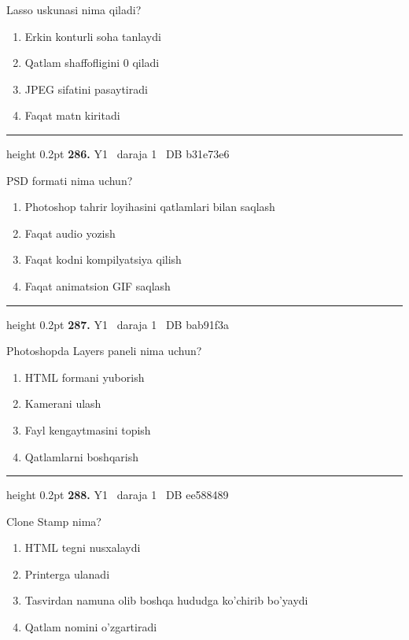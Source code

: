\documentclass[10pt,a4paper,oneside]{article}
\begin{document}
Lasso uskunasi nima qiladi?
\begin{enumerate}[label=\Alph*),leftmargin=9mm]
\item Erkin konturli soha tanlaydi
\item Qatlam shaffofligini 0 qiladi
\item JPEG sifatini pasaytiradi
\item Faqat matn kiritadi
\end{enumerate}
\vspace{2mm}\hrule height 0.2pt \vspace{4mm}
\hypertarget{q286}{\textbf{\color{ink}286.}}  {\color{muted}\scriptsize Y1 \textbullet\ daraja 1 \textbullet\ DB b31e73e6}
\par
PSD formati nima uchun?
\begin{enumerate}[label=\Alph*),leftmargin=9mm]
\item Photoshop tahrir loyihasini qatlamlari bilan saqlash
\item Faqat audio yozish
\item Faqat kodni kompilyatsiya qilish
\item Faqat animatsion GIF saqlash
\end{enumerate}
\vspace{2mm}\hrule height 0.2pt \vspace{4mm}
\hypertarget{q287}{\textbf{\color{ink}287.}}  {\color{muted}\scriptsize Y1 \textbullet\ daraja 1 \textbullet\ DB bab91f3a}
\par
Photoshopda Layers paneli nima uchun?
\begin{enumerate}[label=\Alph*),leftmargin=9mm]
\item HTML formani yuborish
\item Kamerani ulash
\item Fayl kengaytmasini topish
\item Qatlamlarni boshqarish
\end{enumerate}
\vspace{2mm}\hrule height 0.2pt \vspace{4mm}
\hypertarget{q288}{\textbf{\color{ink}288.}}  {\color{muted}\scriptsize Y1 \textbullet\ daraja 1 \textbullet\ DB ee588489}
\par
Clone Stamp nima?
\begin{enumerate}[label=\Alph*),leftmargin=9mm]
\item HTML tegni nusxalaydi
\item Printerga ulanadi
\item Tasvirdan namuna olib boshqa hududga ko'chirib bo'yaydi
\item Qatlam nomini o'zgartiradi
\end{enumerate}
\end{document}

